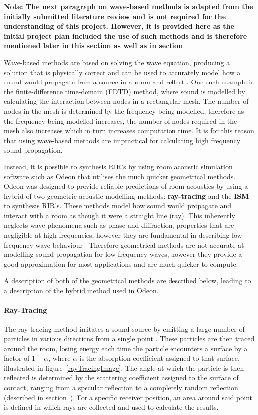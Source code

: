 \documentclass[../../main.tex]{subfiles}
\begin{document}
			\textbf{Note: The next paragraph on wave-based methods is adapted from the initially submitted literature review and is not required for the understanding of this project. However, it is provided here as the initial project plan included the use of such methods and is therefore mentioned later in this section as well as in section~}

			Wave-based methods are based on solving the wave equation, producing a solution that is physically correct and can be used to accurately model how a sound would propagate from a source in a room and reflect \cite{Siltanen2010}. One such example is the finite-difference time-domain (FDTD) method, where sound is modelled by calculating the interaction between nodes in a rectangular mesh. The number of nodes in the mesh is determined by the frequency being modelled, therefore as the frequency being modelled increases, the number of nodes required in the mesh also increases which in turn increases computation time. It is for this reason that using wave-based methods are impractical for calculating high frequency sound propagation.

			Instead, it is possible to synthesis \ac{RIR}'s by using room acoustic simulation software such as Odeon \cite{odeon} that utilises the much quicker geometrical methods. Odeon was designed to provide reliable predictions of room acoustics by using a hybrid of two geometric acoustic modelling methods: \textbf{ray-tracing} and the \textbf{\ac{ISM}} to synthesis \ac{RIR}'s. These methods model how sound would propagate and interact with a room as though it were a straight line (ray). This inherently neglects wave phenomena such as phase and diffraction, properties that are negligible at high frequencies, however they are fundamental in describing low frequency wave behaviour \cite{Siltanen2010}. Therefore geometrical methods are not accurate at modelling sound propagation for low frequency waves, however they provide a good approximation for most applications and are much quicker to compute.

			A description of both of the geometrical methods are described below, leading to a description of the hybrid method used in Odeon.

		\paragraph{Ray-Tracing}
		\label{rayTracing}
			The ray-tracing method imitates a sound source by emitting a large number of particles in various directions from a single point \cite{Rindel1995}. These particles are then traced around the room,  losing energy each time the particle encounters a surface by a factor of $1 - \alpha$, where $\alpha$ is the absorption coefficient assigned to that surface, illustrated in figure~\ref{rayTracingImage}. The angle at which the particle is then reflected is determined by the scattering coefficient assigned to the surface of contact, ranging from a specular reflection to a completely random reflection \cite{odeonManual} (described in section~). For a specific receiver position, an area around said point is defined in which rays are collected and used to calculate the results.
\end{document}
